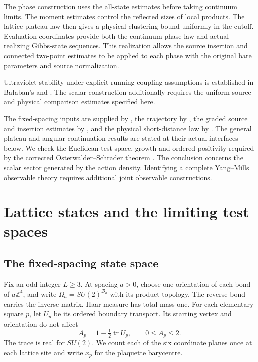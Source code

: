 \documentclass[11pt,letterpaper,reqno]{amsart}
\numberwithin{equation}{section}
\theoremstyle{definition}
\theoremstyle{remark}
\begin{document}
The phase construction uses the all-state estimates before
taking continuum limits. The moment estimates control the
reflected sizes of local products. The lattice plateau law
then gives a physical clustering bound uniformly in the
cutoff. Evaluation coordinates provide both the
continuum phase law and actual realizing Gibbs-state sequences.
This realization allows the source insertion and connected
two-point estimates to be applied to each phase with the
original bare parameters and source normalization.

Ultraviolet stability under explicit running-coupling
assumptions is established in Ba{\l}aban's
\cite[Theorem~2 and Corollary~3, pp.~263--264]{Bal88}
and \cite[Theorem~1, pp.~355--356]{Bal89}.
The scalar construction additionally requires the
uniform source and physical comparison estimates
specified here.

The fixed-spacing inputs are supplied by
\cite{LP}, the trajectory by \cite{RT}, the graded source
and insertion estimates by \cite{SI}, and the physical
short-distance law by \cite{FP}. The general plateau and
angular continuation results are stated at their actual
interfaces below. We check the Euclidean test space,
growth and ordered positivity required by the corrected
Osterwalder--Schrader theorem \cite{OS75}.
The conclusion concerns the scalar sector generated by
the action density. Identifying a complete Yang--Mills
observable theory requires additional joint observable
constructions.

\section{Lattice states and the limiting test spaces}
\label{cl:sec-setting}

\subsection{The fixed-spacing state space}

Fix an odd integer \(L\ge3\). At spacing \(a>0\), choose one
orientation of each bond of \(a\mathbb Z^4\), and write
\(\Omega_a=SU(2)^{\mathcal B_a}\) with its product topology.
The reverse bond carries the inverse matrix. Haar measure has
total mass one. For each elementary square \(p\), let \(U_p\)
be its ordered boundary transport. Its starting vertex and
orientation do not affect
\[
 A_p=1-\tfrac12\operatorname{tr}U_p,\qquad 0\le A_p\le2.
\]
The trace is real for \(SU(2)\). We count each of the six
coordinate planes once at each lattice site and write \(x_p\)
for the plaquette barycentre.
\end{document}
